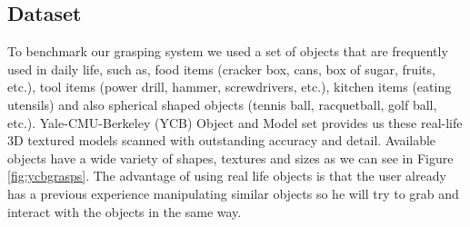 \subsection{Dataset}

To benchmark our grasping system we used a set of objects that are frequently used in daily life, such as, food items (cracker box, cans, box of sugar, fruits, etc.), tool items (power drill, hammer, screwdrivers, etc.), kitchen items (eating utensils) and also spherical shaped objects (tennis ball, racquetball, golf ball, etc.). Yale-CMU-Berkeley (YCB) Object and Model set \cite{calli2015} provides us these real-life 3D textured models scanned with outstanding accuracy and detail. Available objects have a wide variety of shapes, textures and sizes as we can see in Figure \ref{fig:ycbgrasps}. The advantage of using real life objects is that the user already has a previous experience manipulating similar objects so he will try to grab and interact with the objects in the same way.

